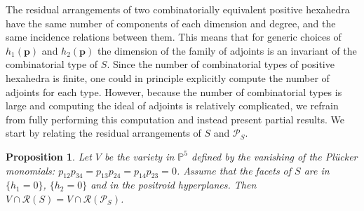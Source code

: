 \documentclass[12pt]{extarticle}
\newtheorem{proposition}[theorem]{Proposition}
\theoremstyle{definition}
\begin{document}
The residual arrangements of two combinatorially equivalent positive hexahedra have the same number of components of each dimension and degree, and the same incidence relations between them. This means that for generic choices of $h_1(\mathbf{p})$ and $h_2(\mathbf{p})$ the dimension of the family of adjoints is an invariant of the combinatorial type of $S$. Since the number of combinatorial types of positive hexahedra is finite, one could in principle explicitly compute the number of adjoints for each type. However, because the number of combinatorial types is large and computing the ideal of adjoints is relatively complicated, we refrain from fully performing this computation and instead present partial results. We start by relating the residual arrangements of $S$ and $\mathcal{P}_S$.



\begin{proposition} \label{prop:posplanes}
    Let $V$ be the variety in $\mathbb{P}^5$ defined by the vanishing of the Pl\"ucker monomials: $p_{12}p_{34} = p_{13}p_{24} = p_{14}p_{23} = 0$. Assume that the facets of $S$ are in $\{h_1=0\}$, $\{h_2=0\}$ and in the positroid hyperplanes. Then $V \cap \mathcal{R}(S) = V \cap \mathcal{R}(\mathcal{P}_S)$. 
\end{proposition}
\end{document}

